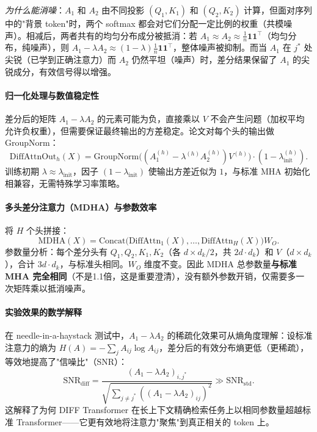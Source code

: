 \documentclass[12pt,a4paper]{article}
\begin{document}
\textit{为什么能消噪}：$A_1$ 和 $A_2$ 由不同投影 $(Q_1, K_1)$ 和 $(Q_2, K_2)$ 计算，但面对序列中的"背景 token"时，两个 softmax 都会对它们分配一定比例的权重（共模噪声）。相减后，两者共有的均匀分布成分被抵消：若 $A_1 \approx A_2 \approx \frac{1}{n} \mathbf{1}\mathbf{1}^\top$（均匀分布，纯噪声），则 $A_1 - \lambda A_2 \approx (1-\lambda)\frac{1}{n}\mathbf{1}\mathbf{1}^\top$，整体噪声被抑制。而当 $A_1$ 在 $j^*$ 处尖锐（已学到正确注意力）而 $A_2$ 仍然平坦（噪声）时，差分结果保留了 $A_1$ 的尖锐成分，有效信号得以增强。

\paragraph{归一化处理与数值稳定性}

差分后的矩阵 $A_1 - \lambda A_2$ 的元素可能为负，直接乘以 $V$ 不会产生问题（加权平均允许负权重），但需要保证最终输出的方差稳定。论文对每个头的输出做 GroupNorm：
\begin{equation}
\text{DiffAttnOut}_h(X) = \mathrm{GroupNorm}\!\bigl((A_1^{(h)} - \lambda^{(h)} A_2^{(h)}) V^{(h)}\bigr) \cdot (1 - \lambda_{\text{init}}^{(h)}).
\end{equation}
训练初期 $\lambda \approx \lambda_{\text{init}}$，因子 $(1 - \lambda_{\text{init}})$ 使输出方差近似为 $1$，与标准 MHA 初始化相兼容，无需特殊学习率策略。

\paragraph{多头差分注意力（MDHA）与参数效率}

将 $H$ 个头拼接：
\begin{equation}
\text{MDHA}(X) = \mathrm{Concat}\!\bigl(\text{DiffAttn}_1(X),\ldots,\text{DiffAttn}_H(X)\bigr) W_O.
\end{equation}
参数量分析：每个差分头有 $Q_1, Q_2, K_1, K_2$（各 $d \times d_k/2$，共 $2d \cdot d_k$）和 $V$（$d \times d_k$），合计 $3d \cdot d_k$，与标准头相同。$W_O$ 维度不变。因此 MDHA 总参数量\textbf{与标准 MHA 完全相同}（不是1.1倍，这是重要澄清），没有额外参数开销，仅需要多一次矩阵乘以抵消噪声。

\paragraph{实验效果的数学解释}

在 needle-in-a-haystack 测试中，$A_1 - \lambda A_2$ 的稀疏化效果可从熵角度理解：设标准注意力的熵为 $H(A) = -\sum_j A_{ij}\log A_{ij}$，差分后的有效分布熵更低（更稀疏），等效地提高了"信噪比"（SNR）：
\begin{equation}
\mathrm{SNR}_{\text{diff}} = \frac{(A_1 - \lambda A_2)_{i,j^*}}{\sqrt{\sum_{j \ne j^*} ((A_1 - \lambda A_2)_{ij})^2}} \gg \mathrm{SNR}_{\mathrm{std}}.
\end{equation}
这解释了为何 DIFF Transformer 在长上下文精确检索任务上以相同参数量超越标准 Transformer——它更有效地将注意力"聚焦"到真正相关的 token 上。
\end{document}
